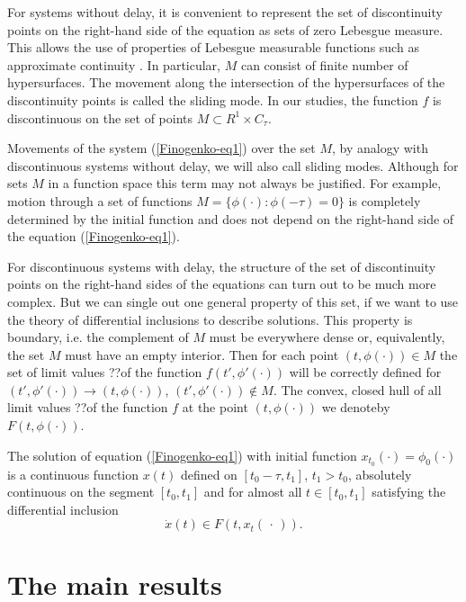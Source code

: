 \documentclass[12pt]{llncs}
\begin{document}
For systems without delay, it is convenient to represent the set of discontinuity points on the right-hand side of the equation as sets of zero Lebesgue measure. This allows the use of properties of Lebesgue measurable functions such as approximate continuity
\cite{Finogenko-second}.
In particular, $M$ can consist of
finite number of hypersurfaces. The movement along the intersection of the hypersurfaces of the discontinuity points is called the sliding mode. In our studies, the function $f$ is discontinuous on the set of points $M\subset R^{1}\times C_{\tau}$.

Movements of the system
(\ref{Finogenko-eq1})
over the set $M$, by analogy with discontinuous systems without delay, we will also call sliding modes. Although for sets $M$ in a function space this term may not always be justified. For example, motion through a set of functions $M=\{\phi(\cdot):\phi(-\tau)=0\}$ is completely determined by the initial function and does not depend on the right-hand side of the equation
(\ref{Finogenko-eq1}).

For discontinuous systems with delay, the structure of the set of discontinuity points on the right-hand sides of the equations can turn out to be much more complex. But we can single out one general property of  this set,  if we want to use  the theory of differential inclusions to describe solutions.  This property is boundary, i.e. the complement of $M$ must be everywhere
dense or, equivalently, the set $M$ must have an empty interior. 
Then for each point $(t,\phi(\cdot))\in M$ the set of limit values ??of the function $f(t',\phi'(\cdot))$ will be correctly defined for $(t', \phi'(\cdot))\rightarrow (t,\phi(\cdot))$, $(t',\phi'(\cdot))\not\in M$.
The convex, closed hull of all limit values ??of the function $f$ at the point
 $(t,\phi(\cdot))$ we denoteby $F(t,\phi(\cdot))$.
 
 The solution of equation
 (\ref{Finogenko-eq1})
 with initial function $x_{t_{0}}(\cdot)=\phi_{0}(\cdot)$
 is a continuous function $x(t)$ defined on 
 $[t_{0}-\tau,t_{1}]$, ${t_{1}>t_{0}}$, absolutely continuous on the segment $[t_{0},t_{1}]$
 and for almost all $t\in [t_{0},t_{1}]$ satisfying the differential inclusion
 \begin{equation}
 	\label{Finogenko-eq2}
 	\dot{x}(t)\in F(t,x_{t}(\,\cdot\,)).
 \end{equation}

\section{The main results}
\end{document}
